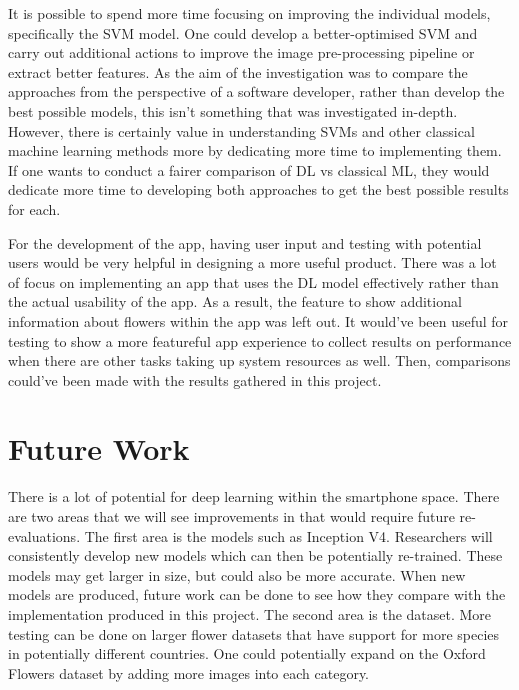 \documentclass[12pt,a4paper]{report}
\begin{document}
\par

It is possible to spend more time focusing on improving the individual models, specifically the SVM model. One could 
develop a better-optimised SVM and carry out additional actions to improve the image pre-processing pipeline or extract 
better features. As the aim of the investigation was to compare the approaches from the perspective of a software 
developer, rather than develop the best possible models, this isn't something that was investigated in-depth. However, 
there is certainly value in understanding SVMs and other classical machine learning methods more by dedicating more time
to implementing them. If one wants to conduct a fairer comparison of DL vs classical ML, they would dedicate more time 
to developing both approaches to get the best possible results for each. 

\par

For the development of the app, having user input and testing with potential users would be very helpful in designing a 
more useful product. There was a lot of focus on implementing an app that uses the DL model effectively rather than the 
actual usability of the app. As a result, the feature to show additional information about flowers within the app was 
left out. It would've been useful for testing to show a more featureful app experience to collect results on performance
when there are other tasks taking up system resources as well. Then, comparisons could've been made with the results 
gathered in this project. 

\section{Future Work}

There is a lot of potential for deep learning within the smartphone space. There are two areas that we will see 
improvements in that would require future re-evaluations. The first area is the models such as Inception V4. 
Researchers will consistently develop new models which can then be potentially re-trained. These models may get larger 
in size, but could also be more accurate. When new models are produced, future work can be done to see how they compare 
with the implementation produced in this project. The second area is the dataset. More testing can be done on larger 
flower datasets that have support for more species in potentially different countries. One could potentially expand on 
the Oxford Flowers dataset by adding more images into each category.
\end{document}
